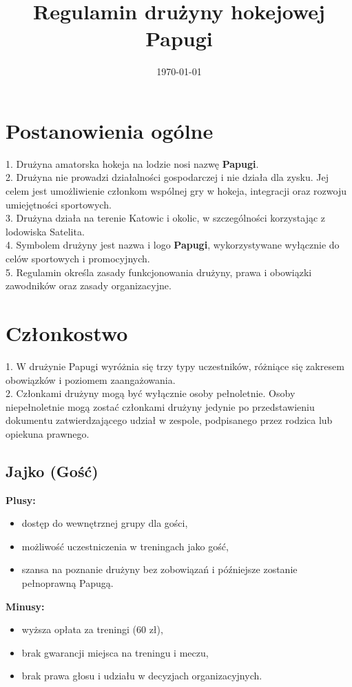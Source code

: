 \documentclass[12pt,a4paper]{article}
\title{Regulamin drużyny hokejowej Papugi}
\date{\today}
\begin{document}
\maketitle

\section{Postanowienia ogólne}
1. Drużyna amatorska hokeja na lodzie nosi nazwę \textbf{Papugi}.\\
2. Drużyna nie prowadzi działalności gospodarczej i nie działa dla zysku. Jej celem jest umożliwienie członkom wspólnej gry w hokeja, integracji oraz rozwoju umiejętności sportowych.\\
3. Drużyna działa na terenie Katowic i okolic, w szczególności korzystając z lodowiska Satelita.\\
4. Symbolem drużyny jest nazwa i logo \textbf{Papugi}, wykorzystywane wyłącznie do celów sportowych i promocyjnych.\\
5. Regulamin określa zasady funkcjonowania drużyny, prawa i obowiązki zawodników oraz zasady organizacyjne.

\section{Członkostwo}
1. W drużynie Papugi wyróżnia się trzy typy uczestników, różniące się zakresem obowiązków i poziomem zaangażowania. \\
2. Członkami drużyny mogą być wyłącznie osoby pełnoletnie. Osoby niepełnoletnie mogą zostać członkami drużyny jedynie po przedstawieniu dokumentu zatwierdzającego udział w zespole, podpisanego przez rodzica lub opiekuna prawnego.

\subsection{Jajko (Gość)}
\textbf{Plusy:}
\begin{itemize}
    \item dostęp do wewnętrznej grupy dla gości,
    \item możliwość uczestniczenia w treningach jako gość,
    \item szansa na poznanie drużyny bez zobowiązań i późniejsze zostanie pełnoprawną Papugą.
\end{itemize}
\textbf{Minusy:}
\begin{itemize}
    \item wyższa opłata za treningi (60 zł),
    \item brak gwarancji miejsca na treningu i meczu,
    \item brak prawa głosu i udziału w decyzjach organizacyjnych.
\end{itemize}
\end{document}
